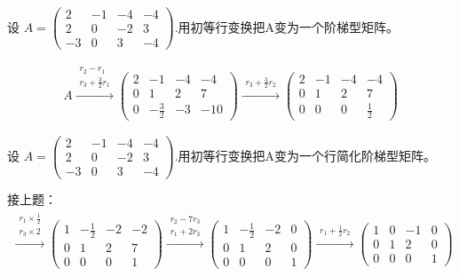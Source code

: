 \documentclass[a4paper]{report}
\begin{document}
\EX 设
$
A=
\begin{pmatrix}
2&-1&-4&-4\\
2&0&-2&3\\
-3&0&3&-4
\end{pmatrix}
$.用初等行变换把A变为一个阶梯型矩阵。

\begin{jie}
\begin{align*}
A\xrightarrow{\substack{r_{2}-r_{1}\\ r_{3}+\frac{3}{2}r_{1}}}
{
\begin{pmatrix}
2&-1&-4&-4\\
0&1&2&7\\
0&-\frac{3}{2}&-3&-10
\end{pmatrix}
}\xrightarrow{\substack{ r_{3}+\frac{3}{2}r_{2}}}
{
\begin{pmatrix}
2&-1&-4&-4\\
0&1&2&7\\
0&0&0&\frac{1}{2}
\end{pmatrix}
}
\end{align*}
\end{jie}

\EX 设
$
A=
\begin{pmatrix}
2&-1&-4&-4\\
2&0&-2&3\\
-3&0&3&-4
\end{pmatrix}
$.用初等行变换把A变为一个行简化阶梯型矩阵。

\begin{jie}
接上题：
\begin{align*}
\xrightarrow{\substack{ r_{1}\times \frac{1}{2}\\ r_3\times 2}}
{
\begin{pmatrix}
1&-\frac{1}{2}&-2&-2\\
0&1&2&7\\
0&0&0&1
\end{pmatrix}
}\xrightarrow{\substack{ r_{2}-7r_3\\ r_1+2r_3}}
{
\begin{pmatrix}
1&-\frac{1}{2}&-2&0\\
0&1&2&0\\
0&0&0&1
\end{pmatrix}
}\xrightarrow{\substack{ r_{1}+\frac{1}{2}r_2}}
{
\begin{pmatrix}
1&0&-1&0\\
0&1&2&0\\
0&0&0&1
\end{pmatrix}
}
\end{align*}
\end{jie}
\end{document}
